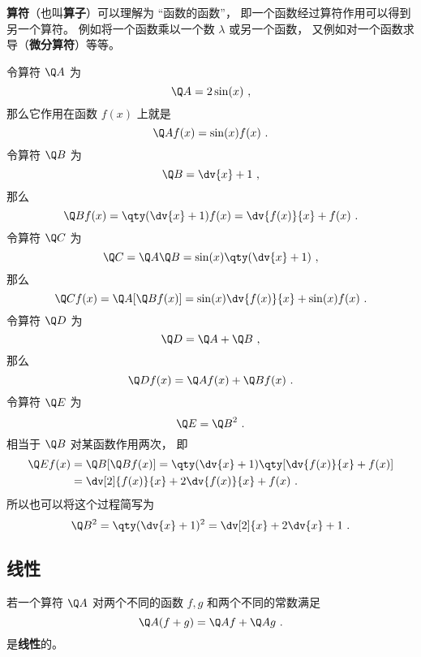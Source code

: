

\textbf{算符}（也叫\textbf{算子}）可以理解为 “函数的函数”， 即一个函数经过算符作用可以得到另一个算符。 例如将一个函数乘以一个数 $\lambda$ 或另一个函数， 又例如对一个函数求导（\textbf{微分算符}）等等。

\begin{example}{}
令算符 $\Q A$ 为
\begin{equation}
\Q A = 2\sin(x)~,
\end{equation}
那么它作用在函数 $f(x)$ 上就是
\begin{equation}
\Q A f(x) = \sin(x) f(x)~.
\end{equation}
令算符 $\Q B$ 为
\begin{equation}
\Q B = \dv{x} + 1~,
\end{equation}
那么
\begin{equation}
\Q B f(x) = \qty(\dv{x} + 1)f(x) = \dv{f(x)}{x} + f(x)~.
\end{equation}
令算符 $\Q C$ 为
\begin{equation}
\Q C = \Q A \Q B = \sin(x) \qty(\dv{x} + 1)~,
\end{equation}
那么
\begin{equation}
\Q C f(x) = \Q A [\Q B f(x)] = \sin(x)\dv{f(x)}{x} + \sin(x)f(x)~.
\end{equation}
令算符 $\Q D$ 为
\begin{equation}
\Q D = \Q A + \Q B~,
\end{equation}
那么
\begin{equation}
\Q D f(x) = \Q A f(x) + \Q B f(x)~.
\end{equation}
令算符 $\Q E$ 为
\begin{equation}
\Q E = {\Q B}^2~.
\end{equation}
相当于 $\Q B$ 对某函数作用两次， 即
\begin{equation}
\begin{aligned}
\Q E f(x) &= \Q B [\Q B f(x)] = \qty(\dv{x} + 1)\qty[\dv{f(x)}{x} + f(x)] \\
&= \dv[2]{f(x)}{x} + 2\dv{f(x)}{x} + f(x)~.
\end{aligned}
\end{equation}
所以也可以将这个过程简写为
\begin{equation}
\Q B^2 = \qty(\dv{x} + 1)^2 = \dv[2]{x} + 2\dv{x} + 1~.
\end{equation}
\end{example}

\subsection{线性}
若一个算符 $\Q A$ 对两个不同的函数 $f, g$ 和两个不同的常数满足
\begin{equation}
\Q A (f + g) = \Q A f + \Q A g~.
\end{equation}
是\textbf{线性}的。
